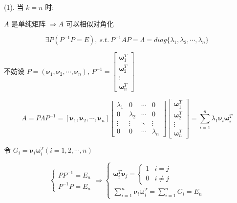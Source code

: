 \begin{anymark}[证明]
	(1). 当 $k = n$ 时:

	$A$ 是单纯矩阵 $\Rightarrow A$ 可以相似对角化

	$$\exists P(P^{-1}P = E),\ s.t.\ P^{-1}AP = \varLambda = diag\{\lambda_{1},\lambda_{2},\cdots,\lambda_{n}\}$$

	不妨设 $P = (\boldsymbol{\nu}_{1},\boldsymbol{\nu}_{2},\cdots,\boldsymbol{\nu}_{n})$, $P^{-1} = \begin{bmatrix}
	  \boldsymbol{\omega}_{1}^{T}\\
	  \boldsymbol{\omega}_{2}^{T}\\
	  \vdots\\
	  \boldsymbol{\omega}_{n}^{T}
	\end{bmatrix}$

	$$A = P\varLambda P^{-1} = [\boldsymbol{\nu}_{1},\boldsymbol{\nu}_{2},\cdots,\boldsymbol{\nu}_{n}]
	\begin{bmatrix}
	  \lambda_{1} & 0           & \cdots & 0\\
	  0           & \lambda_{2} & \cdots & 0\\
	  \vdots      & \vdots      & \ddots & \vdots\\
	  0           & 0           & \cdots & \lambda_{n}
	\end{bmatrix}\begin{bmatrix}
	  \boldsymbol{\omega}_{1}^{T}\\
	  \boldsymbol{\omega}_{2}^{T}\\
	  \vdots\\
	  \boldsymbol{\omega}_{n}^{T}
	\end{bmatrix} = \sum\limits_{i = 1}^{n}\lambda_{1}\boldsymbol{\nu}_{i}\boldsymbol{\omega}_{i}^{T}$$

	令 $G_{i} = \boldsymbol{\nu}_{i}\boldsymbol{\omega}_{i}^{T}(i = 1,2,\cdots,n)$

	$$\begin{cases}
	  PP^{-1} = E_{n}\\
	  P^{-1}P = E_{n}
	\end{cases}\Rightarrow 
	\begin{cases}
		\boldsymbol{\omega}_{i}^{T}\boldsymbol{\nu}_{j} = 
	  		\begin{cases}
	  			1 & i = j\\
	  			0 & i \neq j				
			\end{cases}\\
		\sum\limits_{i = 1}^{n}\boldsymbol{\nu}_{i}\boldsymbol{\omega}_{i}^{T} = \sum\limits_{i = 1}^{n}G_{i} = E_{n}
	\end{cases}$$


\end{anymark}
